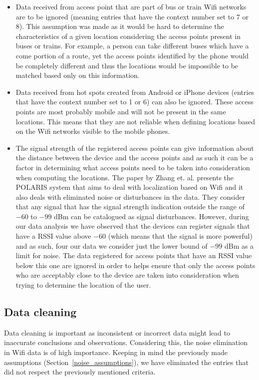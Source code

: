 \begin{itemize}
  \item Data received from access point that are part of bus or train Wifi
  networks are to be ignored (meaning entries that have the context number set
  to 7 or 8). This assumption was made as it would be hard to determine the
  characteristics of a given location considering the access points present in
  buses or trains. For example, a person can take different buses which have a
  come portion of a route, yet the access points identified by the phone would
  be completely different and thus the locations would be impossible to be
  matched based only on this information.
  \item Data received from hot spots created from Android or iPhone devices
  (entries that have the context number set to 1 or 6) can also be ignored.
  These access points are most probably mobile and will not be present in the
  same locations. This means that they are not reliable when defining locations
  based on the Wifi networks visible to the mobile phones.
  \item The signal strength of the registered access points can give
  information about the distance between the device and the access points and
  as such it can be a factor in determining what access points need to be
  taken into consideration when computing the locations. The paper by Zhang
  et. al. \cite{zhang2012polaris} presents the POLARIS system that aims to deal
  with localization based on Wifi and it also deals with eliminated noise or
  disturbances in the data. They consider that any signal that has the signal
  strength indication outside the range of $-60$ to $-99$ dBm can be catalogued
  as signal disturbances. However, during our data analysis we have observed that
  the devices can register signals that have a RSSI value above $-60$ (which
  means that the signal is more powerful) and as such, four our data we
  consider just the lower bound of $-99$ dBm as a limit for noise. The data
  registered for access points that have an RSSI value below this one are
  ignored in order to helps ensure that only the access points who are
  acceptably close to the device are taken into consideration when trying to
  determine the location of the user.
\end{itemize}

\subsection{Data cleaning}
\label{data_cleaning}
Data cleaning is important as inconsistent or incorrect data might lead to
inaccurate conclusions and observations. Considering this, the noise elimination
in Wifi data is of high importance. Keeping in mind the previously made
assumptions (Section~\ref{noise_assumptions}), we have eliminated the entries
that did not respect the previously mentioned criteria. 

